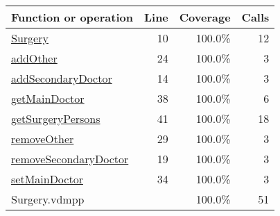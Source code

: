 \bigskip
\begin{longtable}{|l|r|r|r|}
\hline
Function or operation & Line & Coverage & Calls \\
\hline
\hline
\hyperref[Surgery:10]{Surgery} & 10&100.0\% & 12 \\
\hline
\hyperref[addOther:24]{addOther} & 24&100.0\% & 3 \\
\hline
\hyperref[addSecondaryDoctor:14]{addSecondaryDoctor} & 14&100.0\% & 3 \\
\hline
\hyperref[getMainDoctor:38]{getMainDoctor} & 38&100.0\% & 6 \\
\hline
\hyperref[getSurgeryPersons:41]{getSurgeryPersons} & 41&100.0\% & 18 \\
\hline
\hyperref[removeOther:29]{removeOther} & 29&100.0\% & 3 \\
\hline
\hyperref[removeSecondaryDoctor:19]{removeSecondaryDoctor} & 19&100.0\% & 3 \\
\hline
\hyperref[setMainDoctor:34]{setMainDoctor} & 34&100.0\% & 3 \\
\hline
\hline
Surgery.vdmpp & & 100.0\% & 51 \\
\hline
\end{longtable}

